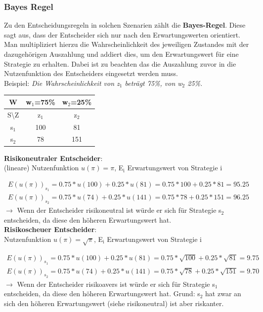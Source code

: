 \documentclass[11pt]{article}
\begin{document}
\subsubsection{Bayes Regel}
\label{sec:orgac9d73c}
Zu den Entscheidungsregeln in solchen Szenarien zählt die \textbf{Bayes-Regel}. Diese sagt aus, dass der Entscheider sich nur nach den Erwartungswerten orientiert. Man multipliziert hierzu die Wahrscheinlichkeit des jeweiligen Zustandes mit der dazugehörigen Auszahlung und addiert dies, um den Erwartungswert für eine Strategie zu erhalten. Dabei ist zu beachten das die Auszahlung zuvor in die Nutzenfunktion des Entscheiders eingesetzt werden muss.\\

Beispiel: \emph{Die Wahrscheinlichkeit von z\(_{\text{1}}\) beträgt 75\%, von w\(_{\text{2}}\) 25\%.} 
\begin{center}
\begin{tabular}{c|c|c}
W & w\(_{\text{1}}\)=75\% & w\(_{\text{2}}\)=25\%\\
\hline
S\textbackslash{Z} & z\(_{\text{1}}\) & z\(_{\text{2}}\)\\
\hline
s\(_{\text{1}}\) & 100 & 81\\
s\(_{\text{2}}\) & 78 & 151\\
\end{tabular}
\end{center}
\textbf{Risikoneutraler Entscheider}:\\
(lineare) Nutzenfunktion \(u(\pi)=\pi\), E\(_{\text{i}}\) Erwartungswert von Strategie i

\begin{equation*}
\begin{aligned}
E(u(\pi))_{s_1} = 0.75*u(100) + 0.25*u(81) = 0.75 * 100 + 0.25*81=95.25\\
E(u(\pi))_{s_2}= 0.75*u(74) + 0.25*u(141) = 0.75*78 + 0.25*151 = 96.25
\end{aligned}
\end{equation*}
\(\rightarrow\) Wenn der Entscheider risikoneutral ist würde er sich für Strategie s\(_{\text{2}}\) entscheiden, da diese den höheren Erwartungswert hat.\\
\textbf{Risikoscheuer Entscheider}:\\
Nutzenfunktion \(u(\pi)=\sqrt{\pi}\), E\(_{\text{i}}\) Erwartungswert von Strategie i

\begin{equation*}
\begin{aligned}
E(u(\pi))_{s_1} = 0.75*u(100) + 0.25*u(81) = 0.75 * \sqrt{100} + 0.25*\sqrt{81}=9.75\\
E(u(\pi))_{s_2}= 0.75*u(74) + 0.25*u(141) = 0.75*\sqrt{78} + 0.25*\sqrt{151} = 9.70
\end{aligned}
\end{equation*}
\(\rightarrow\) Wenn der Entscheider risikoavers ist würde er sich für Strategie s\(_{\text{1}}\) entscheiden, da diese den höheren Erwartungswert hat. Grund: s\(_{\text{2}}\) hat zwar an sich den höheren Erwartungswert (siehe risikoneutral) ist aber riskanter.
\end{document}
